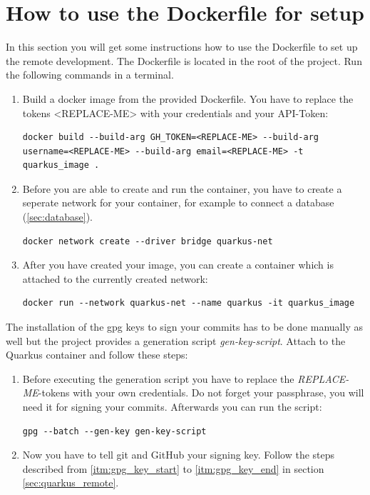     \section{How to use the Dockerfile for setup}\label{sec:dockerfile}
        In this section you will get some instructions how to use the Dockerfile to set up the remote development. The Dockerfile is located in the root of the project. 
        Run the following commands in a terminal. 
        \begin{enumerate}
            \item Build a docker image from the provided Dockerfile. You have to replace the tokens <REPLACE-ME> with your credentials and your API-Token:
            \begin{lstlisting}[style=bash]
docker build --build-arg GH_TOKEN=<REPLACE-ME> --build-arg username=<REPLACE-ME> --build-arg email=<REPLACE-ME> -t quarkus_image .
            \end{lstlisting}
            \item \label{item:network} Before you are able to create and run the container, you have to create a seperate network for your container, for example to connect a database (\ref{sec:database}). 
            \begin{lstlisting}[style=bash]
docker network create --driver bridge quarkus-net
            \end{lstlisting}
            \item After you have created your image, you can create a container which is attached to the currently created network:
            \begin{lstlisting}[style=bash]
docker run --network quarkus-net --name quarkus -it quarkus_image
            \end{lstlisting} 
        \end{enumerate}
        The installation of the gpg keys to sign your commits has to be done manually as well but the project provides a generation script \textit{gen-key-script}. Attach to the Quarkus container and follow these steps: 
        \begin{enumerate}
            \item Before executing the generation script you have to replace the \textit{REPLACE-ME}-tokens with your own credentials. Do not forget your passphrase, you will need it for signing your commits. Afterwards you can run the script: 
            \begin{lstlisting}[style=bash]
gpg --batch --gen-key gen-key-script
            \end{lstlisting}
            \item Now you have to tell git and GitHub your signing key. Follow the steps described from \ref{itm:gpg_key_start} to \ref{itm:gpg_key_end} in section \ref{sec:quarkus_remote}.
        \end{enumerate}
        

